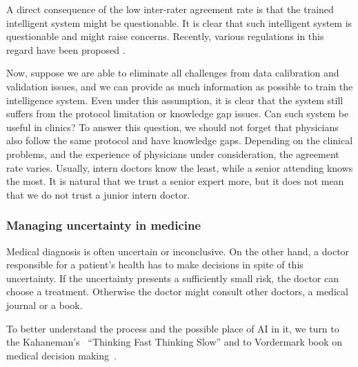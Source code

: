 \documentclass[11pt]{pnas-new}
\begin{document}
  A direct consequence of the low inter-rater agreement rate is that the trained intelligent system might be questionable. 
%  
It is clear that such intelligent system is questionable and might raise concerns. Recently, various regulations in this regard have been proposed \cite{price2014black,ford2016privacy}.


Now, suppose we are able to eliminate all challenges from data
calibration and validation issues, and we can provide as much
information as possible to train the intelligence system. Even under
this assumption, it is clear that the system still suffers from the
protocol limitation or knowledge gap issues. Can such system be useful
in clinics? To answer this question, we should not forget that
physicians also follow the same protocol and have knowledge
gaps. Depending on the clinical problems, and the experience of
physicians under consideration, the agreement rate varies. Usually,
intern doctors know the least, while a senior attending knows the
most. It is natural that we trust a senior expert more, but it does
not mean that we do not trust a junior intern doctor.

\subsubsection*{Managing uncertainty in medicine}
Medical diagnosis is often uncertain or inconclusive. On the other
hand, a doctor responsible for a patient's health has to make
decisions in spite of this uncertainty. If the uncertainty presents a
sufficiently small risk, the doctor can choose a treatment. Otherwise
the doctor might consult other doctors, a medical journal or a book. 

To better understand the process and the possible place of AI in it,
we turn to the Kahaneman's~\cite{kahneman2011thinking} ``Thinking Fast Thinking Slow'' and
to Vordermark book on medical decision
making~\cite{vordermark2019introduction}.
\end{document}
